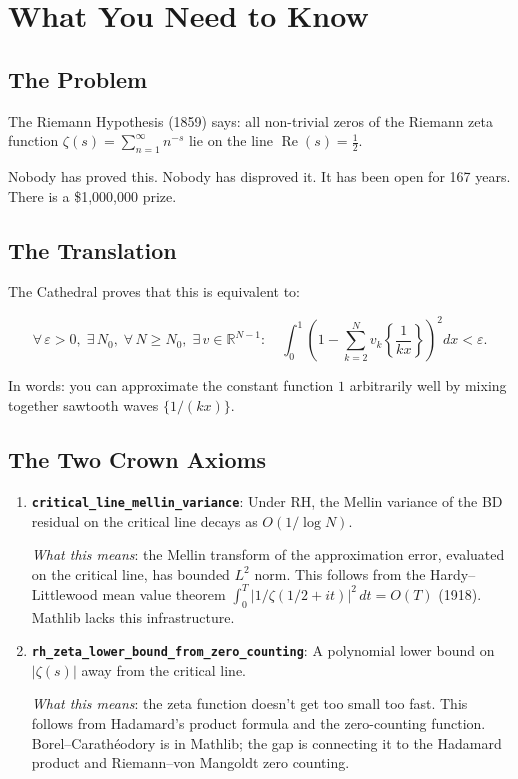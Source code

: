 \documentclass[11pt,a4paper]{article}
\begin{document}
\section*{What You Need to Know}

\subsection*{The Problem}

The Riemann Hypothesis (1859) says: all non-trivial zeros of the
Riemann zeta function $\zeta(s) = \sum_{n=1}^\infty n^{-s}$ lie
on the line $\operatorname{Re}(s) = \frac{1}{2}$.

Nobody has proved this. Nobody has disproved it. It has been open
for 167 years. There is a \$1,000,000 prize.

\subsection*{The Translation}

The Cathedral proves that this is equivalent to:

\[
  \forall\,\varepsilon > 0,\;\exists\,N_0,\;\forall\,N \geq N_0,\;
  \exists\,v \in \mathbb{R}^{N-1}:\quad
  \int_0^1 \left(1 - \sum_{k=2}^N v_k\left\{\frac{1}{kx}\right\}
  \right)^2 dx < \varepsilon.
\]

In words: you can approximate the constant function $1$ arbitrarily
well by mixing together sawtooth waves $\{1/(kx)\}$.

\subsection*{The Two Crown Axioms}

\begin{enumerate}
  \item \textbf{\texttt{critical\_line\_mellin\_variance}}: Under RH,
    the Mellin variance of the BD residual on the critical line
    decays as $O(1/\log N)$.

    \emph{What this means}: the Mellin transform of the approximation
    error, evaluated on the critical line, has bounded $L^2$ norm.
    This follows from the Hardy--Littlewood mean value theorem
    $\int_0^T |1/\zeta(1/2+it)|^2\,dt = O(T)$ (1918).
    Mathlib lacks this infrastructure.

  \item \textbf{\texttt{rh\_zeta\_lower\_bound\_from\_zero\_counting}}:
    A polynomial lower bound on $|\zeta(s)|$ away from the
    critical line.

    \emph{What this means}: the zeta function doesn't get too
    small too fast. This follows from Hadamard's product formula
    and the zero-counting function. Borel--Carath\'eodory is in
    Mathlib; the gap is connecting it to the Hadamard product
    and Riemann--von Mangoldt zero counting.
\end{enumerate}
\end{document}
